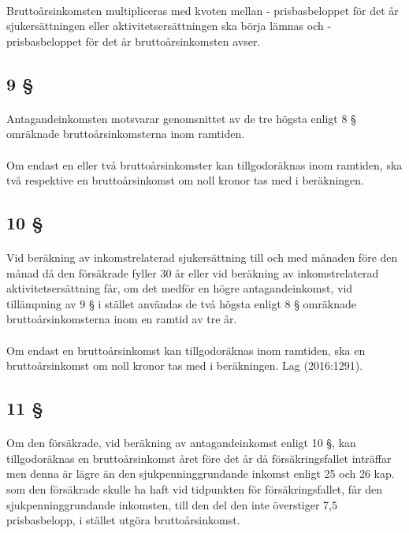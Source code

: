 \documentclass[a4paper,notitlepage,openany,10pt]{book}
\begin{document}
\paragraph*{}
Bruttoårsinkomsten multipliceras med kvoten mellan
\newline - prisbasbeloppet för det år sjukersättningen eller aktivitetsersättningen ska börja lämnas och
\newline - prisbasbeloppet för det år bruttoårsinkomsten avser.
\subsection*{9 §}
\paragraph*{}
Antagandeinkomsten motsvarar genomsnittet av de tre högsta enligt 8 § omräknade bruttoårsinkomsterna inom ramtiden.
\paragraph*{}
Om endast en eller två bruttoårsinkomster kan tillgodoräknas inom ramtiden, ska två respektive en bruttoårsinkomst om noll kronor tas med i beräkningen.
\subsection*{10 §}
\paragraph*{}
Vid beräkning av inkomstrelaterad sjukersättning till och med månaden före den månad då den försäkrade fyller 30 år eller vid beräkning av inkomstrelaterad aktivitetsersättning får, om det medför en högre antagandeinkomst, vid tillämpning av 9 § i stället användas de två högsta enligt 8 § omräknade bruttoårsinkomsterna inom en ramtid av tre år.
\paragraph*{}
Om endast en bruttoårsinkomst kan tillgodoräknas inom ramtiden, ska en bruttoårsinkomst om noll kronor tas med i beräkningen.
Lag (2016:1291).
\subsection*{11 §}
\paragraph*{}
Om den försäkrade, vid beräkning av antagandeinkomst enligt 10 §, kan tillgodoräknas en bruttoårsinkomst året före det år då försäkringsfallet inträffar men denna är lägre än den sjukpenninggrundande inkomst enligt 25 och 26 kap. som den försäkrade skulle ha haft vid tidpunkten för försäkringsfallet, får den sjukpenninggrundande inkomsten, till den del den inte överstiger 7,5 prisbasbelopp, i stället utgöra bruttoårsinkomst.
\end{document}
